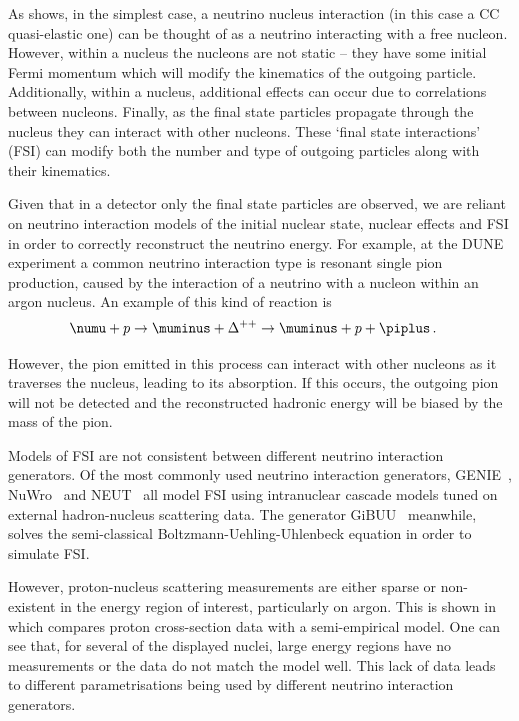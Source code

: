 As  shows, in the simplest case, a neutrino nucleus interaction (in this case a CC quasi-elastic one) can be thought of as a neutrino interacting with a free nucleon.
However, within a nucleus the nucleons are not static -- they have some initial Fermi momentum which will modify the kinematics of the outgoing particle.
Additionally, within a nucleus, additional effects can occur due to correlations between nucleons.
Finally, as the final state particles propagate through the nucleus they can interact with other nucleons.
These `final state interactions' (FSI) can modify both the number and type of outgoing particles along with their kinematics.

Given that in a detector only the final state particles are observed, we are reliant on neutrino interaction models of the initial nuclear state, nuclear effects and FSI in order to correctly reconstruct the neutrino energy.
For example, at the DUNE experiment a common neutrino interaction type is resonant single pion production, caused by the interaction of a neutrino with a nucleon within an argon nucleus.
An example of this kind of reaction is 
\begin{align}
  \numu + p &\rightarrow \muminus + \Delta^{++} \rightarrow \muminus + p + \piplus \, .
 \end{align}

However, the pion emitted in this process can interact with other nucleons as it traverses the nucleus, leading to its absorption.
If this occurs, the outgoing pion will not be detected and the reconstructed hadronic energy will be biased by the mass of the pion.

Models of FSI are not consistent between different neutrino interaction generators.
Of the most commonly used neutrino interaction generators, GENIE~\cite{genie}, NuWro~\cite{nuwro} and NEUT~\cite{neut} all model FSI using intranuclear cascade models tuned on external hadron-nucleus scattering data.
The generator GiBUU~\cite{gibuu} meanwhile, solves the semi-classical Boltzmann-Uehling-Uhlenbeck equation in order to simulate FSI.

However, proton-nucleus scattering measurements are either sparse or non-existent in the energy region of interest, particularly on argon.
This is shown in  which compares proton cross-section data with a semi-empirical model.
One can see that, for several of the displayed nuclei, large energy regions have no measurements or the data do not match the model well.
This lack of data leads to different parametrisations being used by different neutrino interaction generators.

